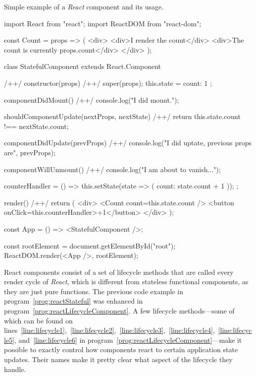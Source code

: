 \begin{program}
\caption{Simple example of a \emph{React} component and its usage.} 
\label{prog:reactLifecycleComponent}
\begin{JsCode}
import React from "react";
import ReactDOM from "react-dom";

const Count = props => (
  <div>
    <div>I render the count</div>
    <div>The count is currently {props.count}</div>
  </div>
);

class StatefulComponent extends React.Component { /+\label{line:extendedStatefulComponent}+/
  constructor(props) { /+\label{line:lifecycle1}+/
    super(props);
    this.state = {
      count: 1
    };
  }

  componentDidMount() { /+\label{line:lifecycle2}+/
    console.log("I did mount.");
  }

  shouldComponentUpdate(nextProps, nextState) { /+\label{line:lifecycle3}+/
    return this.state.count !== nextState.count;
  }

  componentDidUpdate(prevProps) { /+\label{line:lifecycle4}+/
    console.log("I did uptate, previous props are", prevProps);
  }

  componentWillUnmount() { /+\label{line:lifecycle5}+/
    console.log("I am about to vanish...");
  }

  counterHandler = () => {
    this.setState(state => ({ count: state.count + 1 }));
  };

  render() { /+\label{line:lifecycle6}+/
    return (
      <div>
        <Count count={this.state.count} />
        <button onClick={this.counterHandler}>+1</button>
      </div>
    );
  }
}
  
const App = () => <StatefulComponent />;

const rootElement = document.getElementById("root");
ReactDOM.render(<App />, rootElement);  
\end{JsCode}
\end{program}

React components consist of a set of lifecycle methods that are called every render cycle of \emph{React}, which is different from stateless functional components, as they are just pure functions. The previous code example in program~\ref{prog:reactStateful} was enhanced in program~\ref{prog:reactLifecycleComponent}. A few lifecycle methods---some of which can be found on lines~\ref{line:lifecycle1},~\ref{line:lifecycle2},~\ref{line:lifecycle3},~\ref{line:lifecycle4},~\ref{line:lifecycle5}, and~\ref{line:lifecycle6} in program~\ref{prog:reactLifecycleComponent}---make it possible to exactly control how components react to certain application state updates. Their names make it pretty clear what aspect of the lifecycle they handle.

